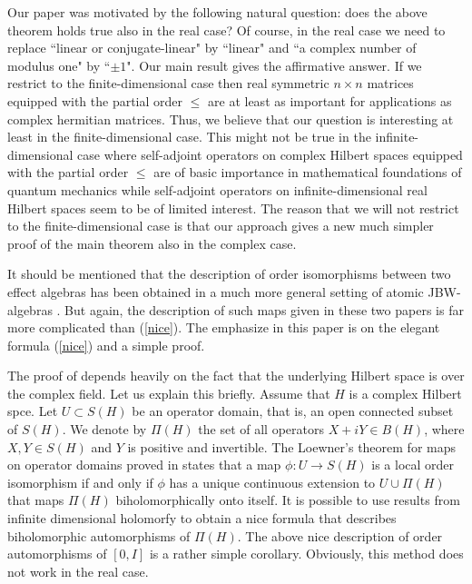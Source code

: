 \documentclass{article}
\begin{document}
Our paper was motivated by the following natural question: does the above theorem holds true also in the real case? Of course, in the real case we need to replace ``linear or conjugate-linear" by ``linear" and ``a complex number of modulus one" by 
``$\pm 1$". Our main result gives the affirmative answer.
If we restrict to the finite-dimensional case then real symmetric $n \times n$ matrices equipped with the partial order $\le$ are at least as important for applications as complex hermitian matrices. Thus, we believe that our question is interesting at least in the finite-dimensional case. This might not be true in the infinite-dimensional case where self-adjoint operators on complex Hilbert spaces  equipped with the partial order $\le$ are of basic importance in mathematical foundations of quantum mechanics while self-adjoint operators on infinite-dimensional real Hilbert spaces seem to be of limited interest. The reason that we will not restrict to the finite-dimensional case is that our approach gives a new much simpler proof of the main theorem also in the complex case.

It should be mentioned that the description of order isomorphisms between two effect algebras has been obtained in a much more general setting of atomic JBW-algebras \cite{RW,VIR}. But again, the description of such maps given in these two papers is far more complicated than (\ref{nice}). The emphasize in this paper is on the elegant formula (\ref{nice}) and a simple proof.

The proof of \cite[Theorem 7.3]{MS}
depends heavily on the fact that the underlying Hilbert space is over the complex field. Let us explain this briefly. Assume that $H$ is a complex Hilbert spce. Let $U \subset S(H)$ be an operator domain, that is, an open connected subset of $S(H)$.
We denote by $\Pi(H)$ the set of all operators $X+iY \in B(H)$, where $X,Y \in S(H)$ and $Y$ is positive and invertible.
The Loewner's theorem for maps on operator domains proved in \cite{MS} states that a map $\phi : U \to S(H)$ is a local order isomorphism if and only if $\phi$ 
 has a unique continuous extension to $U \cup \Pi (H)$ that maps $\Pi (H)$ biholomorphically onto itself. It is possible to use results from infinite dimensional holomorfy \cite{Har} to obtain a nice formula that describes biholomorphic automorphisms of $\Pi (H)$. The above nice description of order automorphisms of $[0,I]$  is a rather simple corollary. Obviously, this method does not work in the real case.
\end{document}
